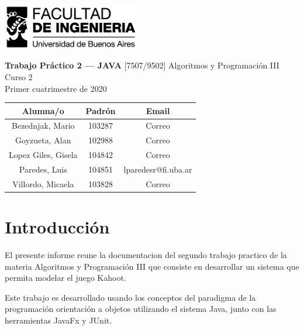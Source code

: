 \documentclass[titlepage,a4paper]{article}
\begin{document}
\begin{titlepage} %
	\hfill\includegraphics[width=6cm]{logofiuba.jpg}
    \centering

    \vfill
    \Huge \textbf{Trabajo Práctico 2 — JAVA}
    \vskip2cm
    \Large [7507/9502] Algoritmos y Programación III\\
    Curso 2 \\ %
    Primer cuatrimestre de 2020 
    \vfill
    
    \begin{tabular}{ | c | c | c |} %
      \hline
      Alumna/o & Padrón & Email \\ \hline
      Bezednjak, Mario & 103287 & Correo \\ \hline
      Goyzueta, Alan & 102988 & Correo \\ \hline
      Lopez Giles, Gisela & 104842 & Correo \\ \hline
	  Paredes, Luis & 104851 & lparedesr@fi.uba.ar\\ \hline
      Villordo, Micaela & 103828 & Correo \\ \hline     
  	\end{tabular}
  	
    \vfill
    \vfill
\end{titlepage}

\tableofcontents %
\newpage

\section{Introducción}\label{sec:intro}
El presente informe reune la documentacion del segundo trabajo practico de la materia Algoritmos y Programación III que consiste en desarrollar un sistema que permita modelar el juego Kahoot.
\newline

Este trabajo es desarrollado usando los conceptos del paradigma de la programación orientación a objetos utilizando el sistema Java, junto con las herramientas JavaFx y JUnit.


\end{document}
